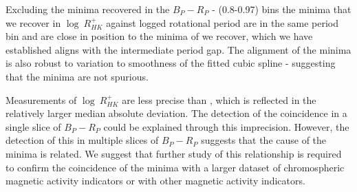 Excluding the minima recovered in the $B_P-R_P$ - (0.8-0.97) bins the minima that we recover in $\log \ R^{+}_{HK}$ against logged rotational period are in the same period bin and are close in position to the minima of \rper{} we recover, which we have established aligns with the intermediate period gap.
The alignment of the minima is also robust to variation to smoothness of the fitted cubic spline - suggesting that the minima are not spurious.

Measurements of $\log \ R^{+}_{HK}$ are less precise than \rper{}, which is reflected in the relatively larger median absolute deviation.
The detection of the coincidence in a single slice of $B_P-R_P$ could be explained through this imprecision.
However, the detection of this in multiple slices of $B_P-R_P$ suggests that the cause of the minima is related.
We suggest that further study of this relationship is required to confirm the coincidence of the minima with a larger dataset of chromospheric magnetic activity indicators or with other magnetic activity indicators.






